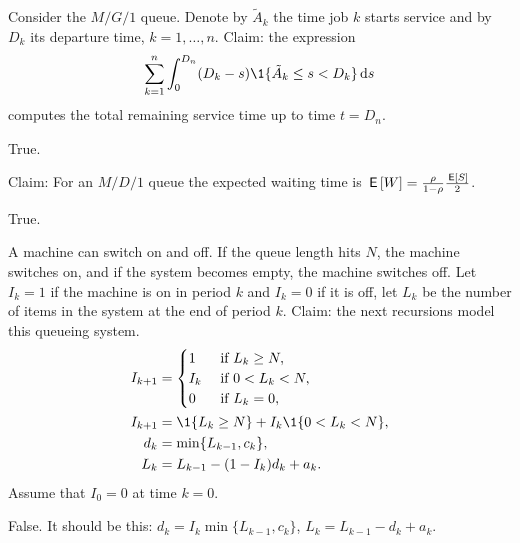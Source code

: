 \documentclass[stochastic-or.tex]{subfiles}
\begin{document}
\begin{truefalse}
Consider the $M/G/1$ queue.
Denote by $\tilde{A}_k$ the time job $k$ starts service and by $D_k$ its departure time, $k=1,\ldots,n$.
Claim: the expression
\begin{equation*}
\sum_{k=1}^{n} \int_0^{D_n} (D_k-s)\1{\tilde A_k \leq s < D_k} \d s
\end{equation*}
computes the total remaining service time up to time $t = D_n$.
\begin{solution}
True.
\end{solution}
\end{truefalse}


\begin{truefalse}
Claim: For an $M/D/1$ queue the expected waiting time is $\,\mathsf{E}\left[W\right]=\frac{\rho}{1-\rho}\frac{\,\mathsf{E}\left[S\right]}{2}$.
    \begin{solution}
        True.
    \end{solution}
\end{truefalse}

\begin{truefalse}[5.6]
A machine can switch on and off.
If the queue length hits $N$, the machine switches on, and if the system becomes empty, the machine switches off.
Let $I_k=1$ if the machine is on in period $k$ and $I_k=0$ if it is off, let $L_k$ be the number of items in the system at the end of period $k$.
Claim: the next recursions model this queueing system.
 \begin{align*}
 I_{k+1} &=
 \begin{cases}
 1 & \text{ if } L_{k} \geq N,\\
 I_k & \text{ if } 0< L_{k} <N,\\
 0 & \text{ if } L_{k} =0,\\
 \end{cases}\\
 I_{k+1} &= \1{L_k\geq N} + I_k \1{0<L_k<N}, \\
d_k &=\min\{L_{k-1}, c_k\}, \\
L_k &= L_{k-1} - (1-I_k) d_k + a_k.
 \end{align*}
 Assume that $I_0 =0$ at time $k=0$.
\begin{solution}
 False.
It should be this: $d_k =I_k \min\{L_{k-1}, c_k\}$, $L_k = L_{k-1} - d_k + a_k$.
\end{solution}
\end{truefalse}
\end{document}
